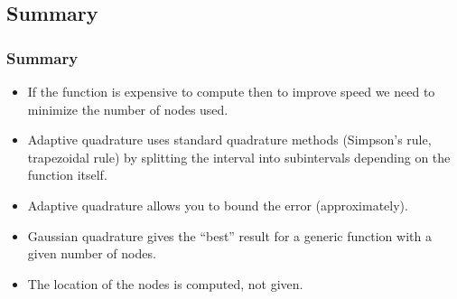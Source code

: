 \documentclass{beamer}
\begin{document}
\subsection{Summary}

\begin{frame}
  \frametitle{Summary}

  \begin{itemize}
  \item If the function is expensive to compute then to improve speed
    we need to minimize the number of nodes used.
  \item Adaptive quadrature uses standard quadrature methods
    (Simpson's rule, trapezoidal rule) by splitting the interval into
    subintervals depending on the function itself.
  \item Adaptive quadrature allows you to bound the error
    (approximately).
  \item Gaussian quadrature gives the ``best'' result for a generic
    function with a given number of nodes.
  \item The location of the nodes is computed, not given.
  \end{itemize}

\end{frame}
\end{document}
